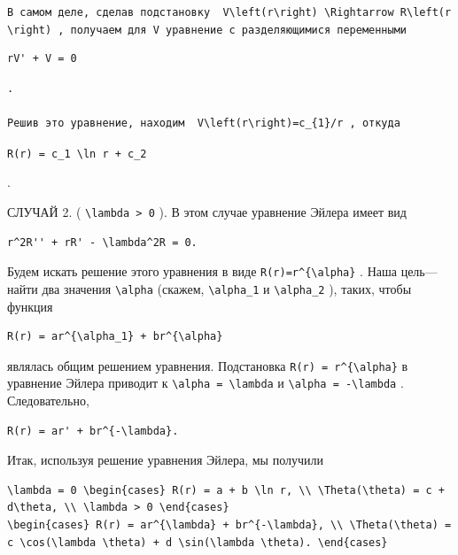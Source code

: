 \documentclass[
  ukrainian,
]{article}
\begin{document}
\texttt{В\ самом\ деле,\ сделав\ подстановку\ \ \textquotesingle{}V\textbackslash{}left(r\textbackslash{}right)\ \textbackslash{}Rightarrow\ R\textquotesingle{}\textbackslash{}left(r\textbackslash{}right)\textquotesingle{}\ ,\ получаем\ для\ V\ уравнение\ с\ разделяющимися\ переменными}

\begin{verbatim}
rV' + V = 0
\end{verbatim}

\begin{verbatim}
.

Решив это уравнение, находим  V\left(r\right)=c_{1}/r , откуда
\end{verbatim}

\texttt{R(r)\ =\ c\_1\ \textbackslash{}ln\ r\ +\ c\_2}

.

СЛУЧАЙ 2. ( \texttt{\textbackslash{}lambda\ \textgreater{}\ 0} ). В этом
случае уравнение Эйлера имеет вид

\begin{verbatim}
r^2R'' + rR' - \lambda^2R = 0.
\end{verbatim}

Будем искать решение этого уравнения в виде
\texttt{R(r)=r\^{}\{\textbackslash{}alpha\}} . Наша цель---найти два
значения \texttt{\textbackslash{}alpha} (скажем,
\texttt{\textbackslash{}alpha\_1} и \texttt{\textbackslash{}alpha\_2} ),
таких, чтобы функция

\begin{verbatim}
R(r) = ar^{\alpha_1} + br^{\alpha}
\end{verbatim}

являлась общим решением уравнения. Подстановка
\texttt{R(r)\ =\ r\^{}\{\textbackslash{}alpha\}} в уравнение Эйлера
приводит к \texttt{\textbackslash{}alpha\ =\ \textbackslash{}lambda} и
\texttt{\textbackslash{}alpha\ =\ -\textbackslash{}lambda} .
Следовательно,

\begin{verbatim}
R(r) = ar' + br^{-\lambda}.
\end{verbatim}

Итак, используя решение уравнения Эйлера, мы получили

\begin{verbatim}
\lambda = 0 \begin{cases} R(r) = a + b \ln r, \\ \Theta(\theta) = c + d\theta, \\ \lambda > 0 \end{cases}
\begin{cases} R(r) = ar^{\lambda} + br^{-\lambda}, \\ \Theta(\theta) = c \cos(\lambda \theta) + d \sin(\lambda \theta). \end{cases}
\end{verbatim}
\end{document}

